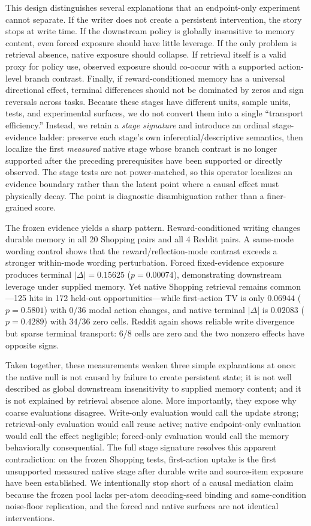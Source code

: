 This design distinguishes several explanations that an endpoint-only experiment cannot separate. If the writer does not create a persistent intervention, the story stops at write time. If the downstream policy is globally insensitive to memory content, even forced exposure should have little leverage. If the only problem is retrieval absence, native exposure should collapse. If retrieval itself is a valid proxy for policy use, observed exposure should co-occur with a supported action-level branch contrast. Finally, if reward-conditioned memory has a universal directional effect, terminal differences should not be dominated by zeros and sign reversals across tasks. Because these stages have different units, sample units, tests, and experimental surfaces, we do not convert them into a single ``transport efficiency.'' Instead, we retain a \emph{stage signature} and introduce an ordinal stage-evidence ladder: preserve each stage's own inferential/descriptive semantics, then localize the first \emph{measured} native stage whose branch contrast is no longer supported after the preceding prerequisites have been supported or directly observed. The stage tests are not power-matched, so this operator localizes an evidence boundary rather than the latent point where a causal effect must physically decay. The point is diagnostic disambiguation rather than a finer-grained score.

The frozen evidence yields a sharp pattern. Reward-conditioned writing changes durable memory in all 20 Shopping pairs and all 4 Reddit pairs. A same-mode wording control shows that the reward/reflection-mode contrast exceeds a stronger within-mode wording perturbation. Forced fixed-evidence exposure produces terminal $|\Delta|=0.15625$ ($p=0.00074$), demonstrating downstream leverage under supplied memory. Yet native Shopping retrieval remains common---125 hits in 172 held-out opportunities---while first-action TV is only $0.06944$ ($p=0.5801$) with 0/36 modal action changes, and native terminal $|\Delta|$ is $0.02083$ ($p=0.4289$) with 34/36 zero cells. Reddit again shows reliable write divergence but sparse terminal transport: 6/8 cells are zero and the two nonzero effects have opposite signs.

Taken together, these measurements weaken three simple explanations at once: the native null is not caused by failure to create persistent state; it is not well described as global downstream insensitivity to supplied memory content; and it is not explained by retrieval absence alone. More importantly, they expose why coarse evaluations disagree. Write-only evaluation would call the update strong; retrieval-only evaluation would call reuse active; native endpoint-only evaluation would call the effect negligible; forced-only evaluation would call the memory behaviorally consequential. The full stage signature resolves this apparent contradiction: on the frozen Shopping tests, first-action uptake is the first unsupported measured native stage after durable write and source-item exposure have been established. We intentionally stop short of a causal mediation claim because the frozen pool lacks per-atom decoding-seed binding and same-condition noise-floor replication, and the forced and native surfaces are not identical interventions.

